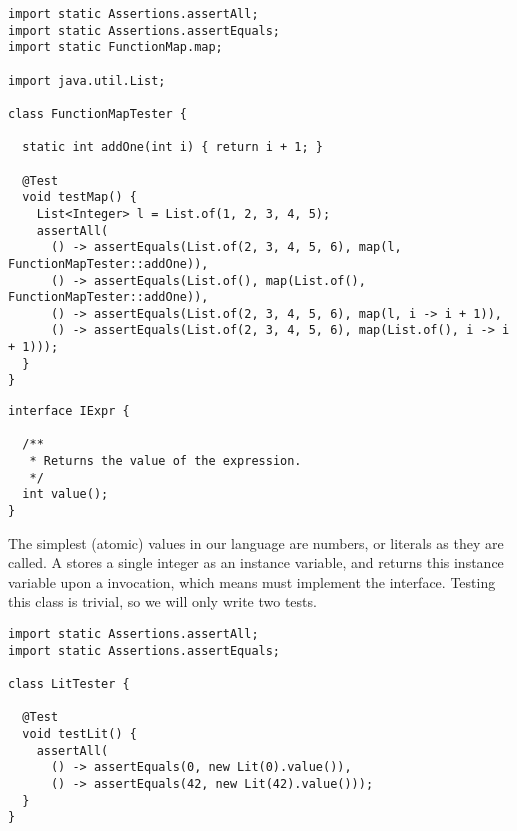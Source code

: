 \begin{lstlisting}[language=MyJava]
import static Assertions.assertAll;
import static Assertions.assertEquals;
import static FunctionMap.map;

import java.util.List;

class FunctionMapTester {

  static int addOne(int i) { return i + 1; }

  @Test
  void testMap() {
    List<Integer> l = List.of(1, 2, 3, 4, 5);
    assertAll(
      () -> assertEquals(List.of(2, 3, 4, 5, 6), map(l, FunctionMapTester::addOne)),
      () -> assertEquals(List.of(), map(List.of(), FunctionMapTester::addOne)),
      () -> assertEquals(List.of(2, 3, 4, 5, 6), map(l, i -> i + 1)),
      () -> assertEquals(List.of(2, 3, 4, 5, 6), map(List.of(), i -> i + 1)));
  }
}
\end{lstlisting}


\begin{lstlisting}[language=MyJava]
interface IExpr {

  /**
   * Returns the value of the expression.
   */
  int value();
}
\end{lstlisting}

The simplest (atomic) values in our language are numbers, or literals as they are called. A  stores a single integer as an instance variable, and returns this instance variable upon a  invocation, which means  must implement the  interface. Testing this class is trivial, so we will only write two tests.

\begin{lstlisting}[language=MyJava]
import static Assertions.assertAll;
import static Assertions.assertEquals;

class LitTester {

  @Test
  void testLit() {
    assertAll(
      () -> assertEquals(0, new Lit(0).value()),      
      () -> assertEquals(42, new Lit(42).value()));
  }
}
\end{lstlisting}

